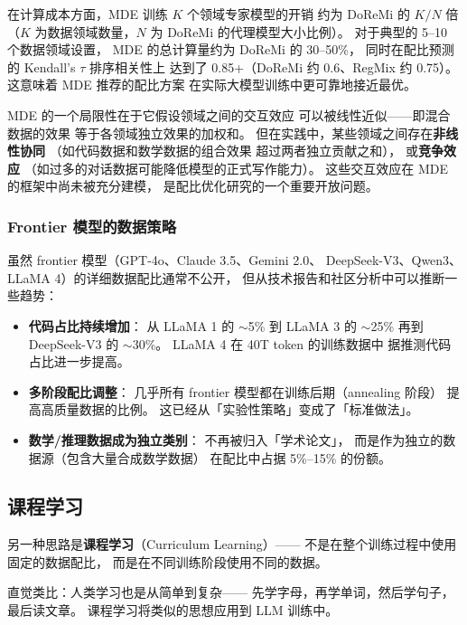 在计算成本方面，MDE 训练 $K$ 个领域专家模型的开销
约为 DoReMi 的 $K/N$ 倍
（$K$ 为数据领域数量，$N$ 为 DoReMi 的代理模型大小比例）。
对于典型的 5--10 个数据领域设置，
MDE 的总计算量约为 DoReMi 的 30--50\%，
同时在配比预测的 Kendall's $\tau$ 排序相关性上
达到了 0.85+（DoReMi 约 0.6、RegMix 约 0.75）。
这意味着 MDE 推荐的配比方案
在实际大模型训练中更可靠地接近最优。

MDE 的一个局限性在于它假设领域之间的交互效应
可以被线性近似——即混合数据的效果
等于各领域独立效果的加权和。
但在实践中，某些领域之间存在\textbf{非线性协同}
（如代码数据和数学数据的组合效果
超过两者独立贡献之和），
或\textbf{竞争效应}
（如过多的对话数据可能降低模型的正式写作能力）。
这些交互效应在 MDE 的框架中尚未被充分建模，
是配比优化研究的一个重要开放问题。

\subsubsection{Frontier 模型的数据策略}

虽然 frontier 模型（GPT-4o、Claude 3.5、Gemini 2.0、
DeepSeek-V3、Qwen3、LLaMA 4）的详细数据配比通常不公开，
但从技术报告和社区分析中可以推断一些趋势：

\begin{itemize}[noitemsep]
  \item \textbf{代码占比持续增加}：
        从 LLaMA 1 的 $\sim$5\% 到 LLaMA 3 的 $\sim$25\%
        再到 DeepSeek-V3 的 $\sim$30\%。
        LLaMA 4 在 40T token 的训练数据中
        据推测代码占比进一步提高。
  \item \textbf{多阶段配比调整}：
        几乎所有 frontier 模型都在训练后期（annealing 阶段）
        提高高质量数据的比例。
        这已经从「实验性策略」变成了「标准做法」。
  \item \textbf{数学/推理数据成为独立类别}：
        不再被归入「学术论文」，
        而是作为独立的数据源（包含大量合成数学数据）
        在配比中占据 5\%--15\% 的份额。
\end{itemize}

\subsection{课程学习}

另一种思路是\textbf{课程学习}（Curriculum Learning）——
不是在整个训练过程中使用固定的数据配比，
而是在不同训练阶段使用不同的数据。

直觉类比：人类学习也是从简单到复杂——
先学字母，再学单词，然后学句子，最后读文章。
课程学习将类似的思想应用到 LLM 训练中。

